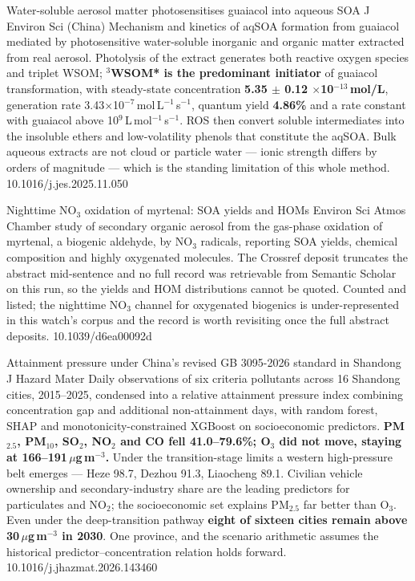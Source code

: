 \documentclass[10pt]{article}
\begin{document}
{Water-soluble aerosol matter photosensitises guaiacol into aqueous SOA}
{J Environ Sci (China)}
{Mechanism and kinetics of aqSOA formation from guaiacol mediated by photosensitive
water-soluble inorganic and organic matter extracted from real aerosol. Photolysis of the
extract generates both reactive oxygen species and triplet WSOM; \textbf{$^3$WSOM* is the
predominant initiator} of guaiacol transformation, with steady-state concentration
\textbf{5.35 $\pm$ 0.12 $\times$10$^{-13}$\,mol/L}, generation rate
3.43$\times$10$^{-7}$\,mol\,L$^{-1}$\,s$^{-1}$, quantum yield \textbf{4.86\%} and a rate
constant with guaiacol above 10$^9$\,L\,mol$^{-1}$\,s$^{-1}$. ROS then convert soluble
intermediates into the insoluble ethers and low-volatility phenols that constitute the
aqSOA. Bulk aqueous extracts are not cloud or particle water --- ionic strength differs by
orders of magnitude --- which is the standing limitation of this whole method.}
{10.1016/j.jes.2025.11.050}

{Nighttime NO$_3$ oxidation of myrtenal: SOA yields and HOMs}
{Environ Sci Atmos}
{Chamber study of secondary organic aerosol from the gas-phase oxidation of myrtenal, a
biogenic aldehyde, by NO$_3$ radicals, reporting SOA yields, chemical composition and
highly oxygenated molecules. The Crossref deposit truncates the abstract mid-sentence and
no full record was retrievable from Semantic Scholar on this run, so the yields and HOM
distributions cannot be quoted. Counted and listed; the nighttime NO$_3$ channel for
oxygenated biogenics is under-represented in this watch's corpus and the record is worth
revisiting once the full abstract deposits.}
{10.1039/d6ea00092d}


{Attainment pressure under China's revised GB 3095-2026 standard in Shandong}
{J Hazard Mater}
{Daily observations of six criteria pollutants across 16 Shandong cities, 2015--2025,
condensed into a relative attainment pressure index combining concentration gap and
additional non-attainment days, with random forest, SHAP and monotonicity-constrained
XGBoost on socioeconomic predictors. \textbf{PM$_{2.5}$, PM$_{10}$, SO$_2$, NO$_2$ and CO
fell 41.0--79.6\%; O$_3$ did not move, staying at 166--191\,$\mu$g\,m$^{-3}$.} Under the
transition-stage limits a western high-pressure belt emerges --- Heze 98.7, Dezhou 91.3,
Liaocheng 89.1. Civilian vehicle ownership and secondary-industry share are the leading
predictors for particulates and NO$_2$; the socioeconomic set explains PM$_{2.5}$ far
better than O$_3$. Even under the deep-transition pathway \textbf{eight of sixteen cities
remain above 30\,$\mu$g\,m$^{-3}$ in 2030}. One province, and the scenario arithmetic
assumes the historical predictor--concentration relation holds forward.}
{10.1016/j.jhazmat.2026.143460}
\end{document}
